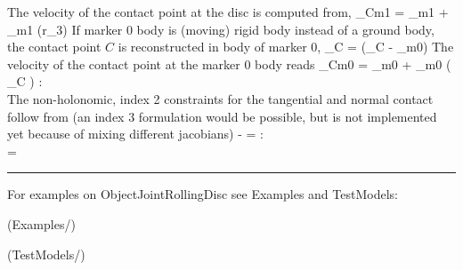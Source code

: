     \ee
    The velocity of the contact point at the disc is computed from,
    \be
      _{Cm1} = _{m1} + _{m1} \times (r\cdot {}_3)
    \ee
    If marker 0 body is (moving) rigid body instead of a ground body, the contact point $C$ is reconstructed in 
    body of marker 0,
    \be
      _{C} =  (_{C} - _{m0})
    \ee
    The velocity of the contact point at the marker 0 body reads
    \be
      _{Cm0} = _{m0} + _{m0} \times \left(  _{C} \right)
    \ee
%
    :\\
    The non-holonomic, index 2 constraints for the tangential and normal contact follow from (an index 3 formulation would be possible, but is not implemented yet because of mixing different jacobians)
    \be
       - = \Null
    \ee
    :\\
    \be
      \zv = \Null
    \ee
\vspace{6pt}\par\noindent\rule{\textwidth}{0.4pt}
%
\noindent For examples on ObjectJointRollingDisc see Examples and TestModels:
\bi
\item {} (Examples/)
\item {} (TestModels/)
\ei

%
\newpage

